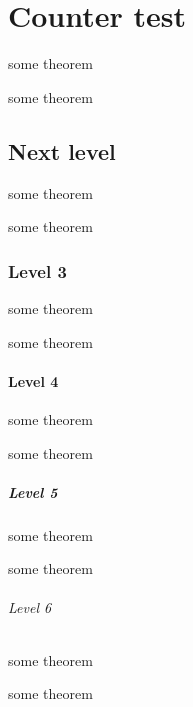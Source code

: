 \hypertarget{counter-test}{%
\chapter{Counter test}\label{counter-test}}

\begin{Theorem}
some theorem
\end{Theorem}

\begin{Theorem}
some theorem
\end{Theorem}

\hypertarget{next-level}{%
\section{Next level}\label{next-level}}

\begin{Theorem}
some theorem
\end{Theorem}

\begin{Theorem}
some theorem
\end{Theorem}

\hypertarget{level-3}{%
\subsection{Level 3}\label{level-3}}

\begin{Theorem}
some theorem
\end{Theorem}

\begin{Theorem}
some theorem
\end{Theorem}

\hypertarget{level-4}{%
\subsubsection{Level 4}\label{level-4}}

\begin{Theorem}
some theorem
\end{Theorem}

\begin{Theorem}
some theorem
\end{Theorem}

\hypertarget{level-5}{%
\paragraph{Level 5}\label{level-5}}

\begin{Theorem}
some theorem
\end{Theorem}

\begin{Theorem}
some theorem
\end{Theorem}

\hypertarget{level-6}{%
\subparagraph{Level 6}\label{level-6}}

\begin{Theorem}
some theorem
\end{Theorem}

\begin{Theorem}
some theorem
\end{Theorem}
